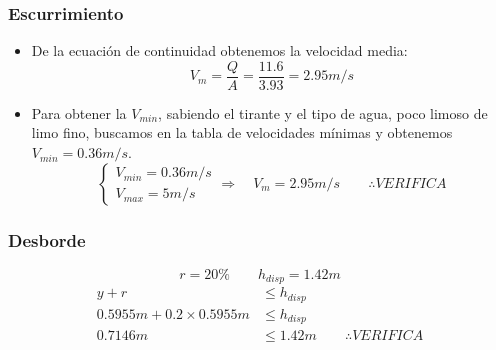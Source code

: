 \subsubsection*{Escurrimiento}

\begin{itemize}
 \item De la ecuación de continuidad obtenemos la velocidad media:
    \begin{equation*}
    V_{m} = \dfrac{Q}{A} = \dfrac{11.6}{3.93} = 2.95 m/s
    \end{equation*}
 \item Para obtener la $V_{min}$, sabiendo el tirante y el tipo de agua, poco limoso de limo fino, buscamos en
 la tabla de velocidades mínimas y obtenemos $V_{min} = 0.36 m/s$.
    \begin{equation*}
      \begin{cases}
      V_{min} = 0.36 m/s \\
      V_{max} = 5 m/s
      \end{cases}
      \Longrightarrow \quad
      V_{m} = 2.95 m/s
      \qquad
      \therefore VERIFICA
    \end{equation*}
\end{itemize}

\subsubsection*{Desborde}

\begin{equation*}
 r = 20\%
 \qquad
 h_{disp} = 1.42 m
\end{equation*}
\begin{align*}
 y + r &\leq h_{disp} \\
 0.5955 m + 0.2 \times 0.5955 m &\leq h_{disp} \\
 0.7146 m &\leq 1.42 m
 \qquad
 \therefore VERIFICA
\end{align*}

